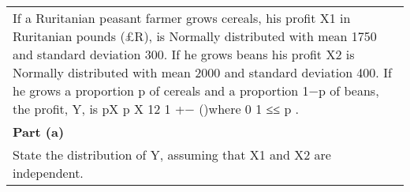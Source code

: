 \documentclass[a4paper,12pt]{article}
\begin{document}
\begin{table}[ht!]
     \centering
     \begin{tabular}{|p{15cm}|}
     \hline        
If a Ruritanian peasant farmer grows cereals, his profit X1 in Ruritanian pounds (£R),  is Normally distributed with mean
 1750 and standard deviation 300.  If he grows beans his profit X2 is Normally distributed with mean 2000 and standard deviation 400.  If he grows a proportion p of cereals and a proportion 1−p of beans, the profit, Y, is pX p X 12 1 +− ()where 0 1 ≤≤ p .
\\
\noindent \textbf{Part (a)}\\
State the distribution of Y, assuming that X1 and X2 are independent.\\

 \hline
      \end{tabular}
    \end{table}
    
\end{document}
